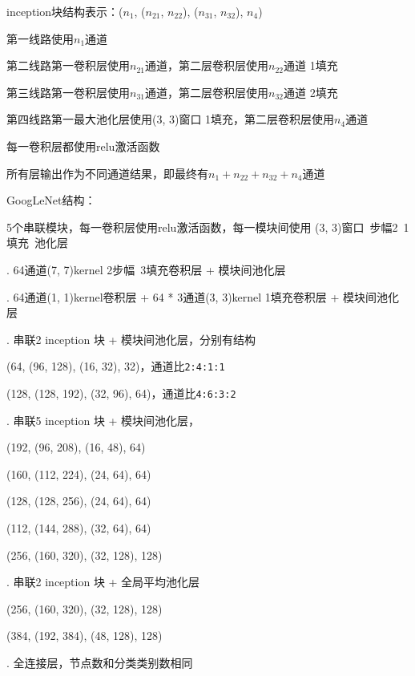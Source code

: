 \documentclass[UTF8]{ctexart}
\begin{document}
  \quad inception块结构表示：($n_1$, ($n_{21}$, $n_{22}$), ($n_{31}$, $n_{32}$), $n_4$) 
  
  \quad \quad 第一线路使用$n_1$通道
 
  \quad \quad 第二线路第一卷积层使用$n_{21}$通道，第二层卷积层使用$n_{22}$通道 1填充
 
  \quad \quad 第三线路第一卷积层使用$n_{31}$通道，第二层卷积层使用$n_{32}$通道 2填充
  
  \quad \quad 第四线路第一最大池化层使用(3, 3)窗口 1填充，第二层卷积层使用$n_4$通道

  \quad 每一卷积层都使用relu激活函数

  \quad 所有层输出作为不同通道结果，即最终有$n_1 + n_{22} + n_{32} + n_4$通道

  GoogLeNet结构：

  \quad 5个串联模块，每一卷积层使用relu激活函数，每一模块间使用 (3, 3)窗口\ 步幅2\ 1填充\ 池化层

  . 64通道(7, 7)kernel 2步幅\ 3填充卷积层 + 模块间池化层

  . 64通道(1, 1)kernel卷积层 + 64 * 3通道(3, 3)kernel 1填充卷积层 + 模块间池化层

  . 串联2 inception 块 + 模块间池化层，分别有结构

  \quad \quad (64, (96, 128), (16, 32), 32)，通道比\texttt{2:4:1:1}

  \quad \quad (128, (128, 192), (32, 96), 64)，通道比\texttt{4:6:3:2}

  . 串联5 inception 块 + 模块间池化层，

  \quad \quad (192, (96, 208), (16, 48), 64)

  \quad \quad (160, (112, 224), (24, 64), 64)

  \quad \quad (128, (128, 256), (24, 64), 64)

  \quad \quad (112, (144, 288), (32, 64), 64)

  \quad \quad (256, (160, 320), (32, 128), 128)

  . 串联2 inception 块 + 全局平均池化层

  \quad \quad (256, (160, 320), (32, 128), 128)

  \quad \quad (384, (192, 384), (48, 128), 128)

  . 全连接层，节点数和分类类别数相同

\end{document}

